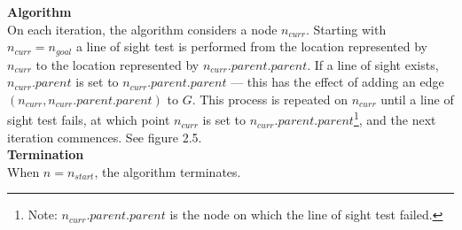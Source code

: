 \documentclass[12pt,notitlepage]{report}
\begin{document}
\noindent
{\bf Algorithm}\\
\noindent
On each iteration, the algorithm considers a node $n_{curr}$. Starting with $n_{curr} = n_{goal}$ a line of sight test is performed from the location represented by $n_{curr}$ to the location represented by $n_{curr}.parent.parent$. If a line of sight exists, $n_{curr}.parent$ is set to $n_{curr}.parent.parent$ --- this has the effect of adding an edge $(n_{curr},n_{curr}.parent.parent)$ to $G$. This process is repeated on $n_{curr}$ until a line of sight test fails, at which point $n_{curr}$ is set to $n_{curr}.parent.parent$\footnote{Note: $n_{curr}.parent.parent$ is the node on which the line of sight test failed.}, and the next iteration commences. See figure 2.5. \\

\noindent
{\bf Termination}\\
\noindent
When $n = n_{start}$, the algorithm terminates.\\
\end{document}
